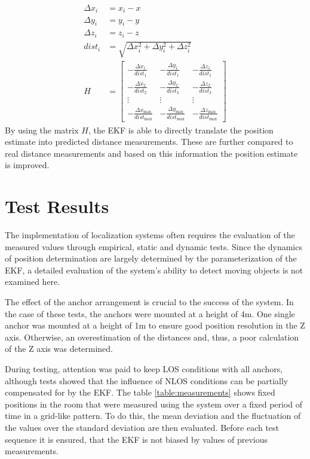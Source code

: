 \documentclass[conference, a4paper]{IEEEtran}
\begin{document}
\begin{equation}
	\begin{aligned}
		\Delta x_i &= x_i - x \\
		\Delta y_i &= y_i - y \\
		\Delta z_i &= z_i - z \\
		dist_i &= \sqrt{{\Delta x_i^2 + \Delta y_i^2 + \Delta z_i^2}} \\
		H &= \begin{bmatrix}
			-\frac{{\Delta x_1}}{{dist_1}} & -\frac{{\Delta y_1}}{{dist_1}} & -\frac{{\Delta z_1}}{{dist_1}} \\
			-\frac{{\Delta x_2}}{{dist_2}} & -\frac{{\Delta y_2}}{{dist_2}} & -\frac{{\Delta z_2}}{{dist_2}} \\
			\vdots & \vdots & \vdots \\
			-\frac{{\Delta x_{\text{max}}}}{{dist_{\text{max}}}} & -\frac{{\Delta y_{\text{max}}}}{{dist_{\text{max}}}} & -\frac{{\Delta z_{\text{max}}}}{{dist_{\text{max}}}}
		\end{bmatrix}
	\end{aligned}
	\label{eq:measurementmatrix}
\end{equation}
By using the matrix $H$, the \ac{EKF} is able to directly translate the position estimate into predicted distance measurements.
These are further compared to real distance measurements and based on this information the position estimate is improved.


\section{Test Results}\label{section:tests}
The implementation of localization systems often requires the evaluation of the measured values through empirical,
static and dynamic tests.
Since the dynamics of position determination are largely determined by the parameterization of the \ac{EKF},
a detailed evaluation of the system's ability to detect moving objects is not examined here.

The effect of the anchor arrangement is crucial to the success of the system.
In the case of these tests, the anchors were mounted at a height of 4m.
One single anchor was mounted at a height of 1m to ensure good position resolution in the Z axis.
Otherwise, an overestimation of the distances and, thus, a poor calculation of the Z axis was determined.

During testing, attention was paid to keep \ac{LOS} conditions with all anchors,
although tests showed that the influence of \ac{NLOS} conditions can be partially compensated for by the \ac{EKF}.
The table \ref{table:measurements} shows fixed positions in the room that were measured using the system
over a fixed period of time in a grid-like pattern. 
To do this, the mean deviation and the fluctuation of the values over the standard deviation are then evaluated. 
Before each test sequence it is ensured, that the \ac{EKF} is not biased by values of previous measurements. 
\end{document}
